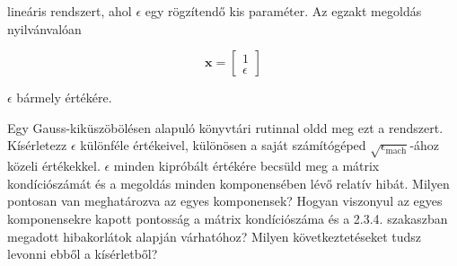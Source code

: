 \documentclass[
  magyar,
  11pt]{article}
\providecommand{\boldsymbol}[1]{\mathbf{#1}}
\begin{document}
lineáris rendszert, ahol \(\epsilon\) egy rögzítendő kis paraméter. Az
egzakt megoldás nyilvánvalóan

\[\boldsymbol{x} = \begin{bmatrix} 1 \\ \epsilon \end{bmatrix}\]

\(\epsilon\) bármely értékére.

Egy Gauss-kiküszöbölésen alapuló könyvtári rutinnal oldd meg ezt a
rendszert. Kísérletezz \(\epsilon\) különféle értékeivel, különösen a
saját számítógéped \(\sqrt{\epsilon_{\text{mach}}}\)-ához közeli
értékekkel. \(\epsilon\) minden kipróbált értékére becsüld meg a mátrix
kondíciószámát és a megoldás minden komponensében lévő relatív hibát.
Milyen pontosan van meghatározva az egyes komponensek? Hogyan viszonyul
az egyes komponensekre kapott pontosság a mátrix kondíciószáma és a
2.3.4. szakaszban megadott hibakorlátok alapján várhatóhoz? Milyen
következtetéseket tudsz levonni ebből a kísérletből?
\end{document}
